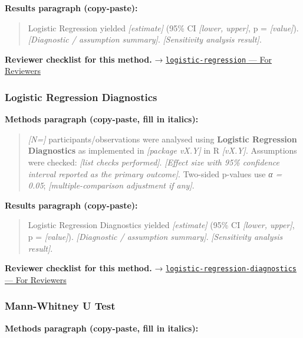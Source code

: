 \documentclass[
]{article}
\begin{document}
\textbf{Results paragraph (copy-paste):}

\begin{quote}
Logistic Regression yielded \emph{{[}estimate{]}} (95\% CI
\emph{{[}lower, upper{]}}, p = \emph{{[}value{]}}). \emph{{[}Diagnostic
/ assumption summary{]}}. \emph{{[}Sensitivity analysis result{]}}.
\end{quote}

\textbf{Reviewer checklist for this method.} →
\href{../chapters/07-regression/logistic-regression.Rmd\#for-reviewers}{\texttt{logistic-regression}
--- For Reviewers}

\subsubsection{Logistic Regression
Diagnostics}\label{logistic-regression-diagnostics}

\textbf{Methods paragraph (copy-paste, fill in italics):}

\begin{quote}
\emph{{[}N={]}} participants/observations were analysed using
\textbf{Logistic Regression Diagnostics} as implemented in
\emph{{[}package vX.Y{]}} in R \emph{{[}vX.Y{]}}. Assumptions were
checked: \emph{{[}list checks performed{]}}. \emph{{[}Effect size with
95\% confidence interval reported as the primary outcome{]}}. Two-sided
p-values use \emph{α = 0.05}; \emph{{[}multiple-comparison adjustment if
any{]}}.
\end{quote}

\textbf{Results paragraph (copy-paste):}

\begin{quote}
Logistic Regression Diagnostics yielded \emph{{[}estimate{]}} (95\% CI
\emph{{[}lower, upper{]}}, p = \emph{{[}value{]}}). \emph{{[}Diagnostic
/ assumption summary{]}}. \emph{{[}Sensitivity analysis result{]}}.
\end{quote}

\textbf{Reviewer checklist for this method.} →
\href{../chapters/07-regression/logistic-regression-diagnostics.Rmd\#for-reviewers}{\texttt{logistic-regression-diagnostics}
--- For Reviewers}

\subsubsection{Mann-Whitney U Test}\label{mann-whitney-u-test}

\textbf{Methods paragraph (copy-paste, fill in italics):}
\end{document}
